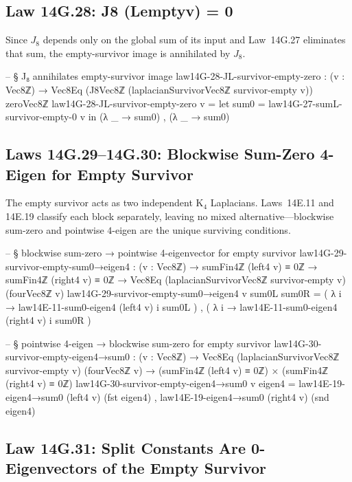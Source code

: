 \documentclass[11pt,a4paper]{book}
\def\Leftrightarrow{<=>}%
\def\mathrm#1{#1}%
\def\texorpdfstring#1#2{#2}%
\begin{document}
\subsection{Law 14G.28: \texorpdfstring{$J_8 (L_{\mathrm{empty}}\,v) = 0$}{J8 (Lemptyv) = 0}}

Since $J_8$ depends only on the global sum of its input and Law~14G.27 eliminates that sum, the empty-survivor image is annihilated by $J_8$.

\begin{code}
-- § J₈ annihilates empty-survivor image
law14G-28-JL-survivor-empty-zero : (v : Vec8ℤ) → Vec8Eq (J8Vec8ℤ (laplacianSurvivorVec8ℤ survivor-empty v)) zeroVec8ℤ
law14G-28-JL-survivor-empty-zero v =
  let sum0 = law14G-27-sumL-survivor-empty-0 v in
  (λ _ → sum0) , (λ _ → sum0)
\end{code}

\subsection{Laws 14G.29--14G.30: Blockwise Sum-Zero \texorpdfstring{$\Leftrightarrow$}{} 4-Eigen for Empty Survivor}

The empty survivor acts as two independent K$_4$ Laplacians. Laws~14E.11 and 14E.19 classify each block separately, leaving no mixed alternative---blockwise sum-zero and pointwise $4$-eigen are the unique surviving conditions.

\begin{code}
-- § blockwise sum-zero → pointwise 4-eigenvector for empty survivor
law14G-29-survivor-empty-sum0→eigen4 : (v : Vec8ℤ) → sumFin4ℤ (left4 v) ≡ 0ℤ → sumFin4ℤ (right4 v) ≡ 0ℤ →
  Vec8Eq (laplacianSurvivorVec8ℤ survivor-empty v) (fourVec8ℤ v)
law14G-29-survivor-empty-sum0→eigen4 v sum0L sum0R =
  ( λ i → law14E-11-sum0-eigen4 (left4 v) i sum0L ) ,
  ( λ i → law14E-11-sum0-eigen4 (right4 v) i sum0R )

-- § pointwise 4-eigen → blockwise sum-zero for empty survivor
law14G-30-survivor-empty-eigen4→sum0 : (v : Vec8ℤ) → Vec8Eq (laplacianSurvivorVec8ℤ survivor-empty v) (fourVec8ℤ v) →
  (sumFin4ℤ (left4 v) ≡ 0ℤ) × (sumFin4ℤ (right4 v) ≡ 0ℤ)
law14G-30-survivor-empty-eigen4→sum0 v eigen4 =
  law14E-19-eigen4→sum0 (left4 v) (fst eigen4) ,
  law14E-19-eigen4→sum0 (right4 v) (snd eigen4)
\end{code}

\subsection{Law 14G.31: Split Constants Are 0-Eigenvectors of the Empty Survivor}
\end{document}
